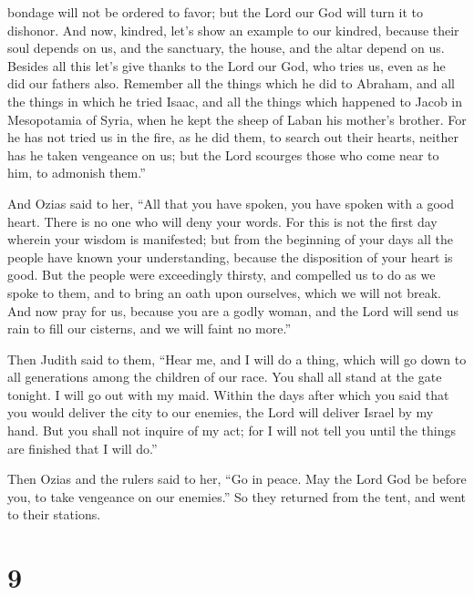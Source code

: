 bondage will not be ordered to favor; but the Lord our God will turn it
to dishonor.  And now, kindred, let's show an example to
our kindred, because their soul depends on us, and the sanctuary, the
house, and the altar depend on us.  Besides all this let's
give thanks to the Lord our God, who tries us, even as he did our
fathers also.  Remember all the things which he did to
Abraham, and all the things in which he tried Isaac, and all the things
which happened to Jacob in Mesopotamia of Syria, when he kept the sheep
of Laban his mother's brother.  For he has not tried us in
the fire, as he did them, to search out their hearts, neither has he
taken vengeance on us; but the Lord scourges those who come near to him,
to admonish them.''

 And Ozias said to her, ``All that you have spoken, you
have spoken with a good heart. There is no one who will deny your words.
 For this is not the first day wherein your wisdom is
manifested; but from the beginning of your days all the people have
known your understanding, because the disposition of your heart is good.
 But the people were exceedingly thirsty, and compelled us
to do as we spoke to them, and to bring an oath upon ourselves, which we
will not break.  And now pray for us, because you are a
godly woman, and the Lord will send us rain to fill our cisterns, and we
will faint no more.''

 Then Judith said to them, ``Hear me, and I will do a
thing, which will go down to all generations among the children of our
race.  You shall all stand at the gate tonight. I will go
out with my maid. Within the days after which you said that you would
deliver the city to our enemies, the Lord will deliver Israel by my
hand.  But you shall not inquire of my act; for I will not
tell you until the things are finished that I will do.''

 Then Ozias and the rulers said to her, ``Go in peace. May
the Lord God be before you, to take vengeance on our enemies.''
 So they returned from the tent, and went to their
stations.

\hypertarget{section-8}{%
\section{9}\label{section-8}}

